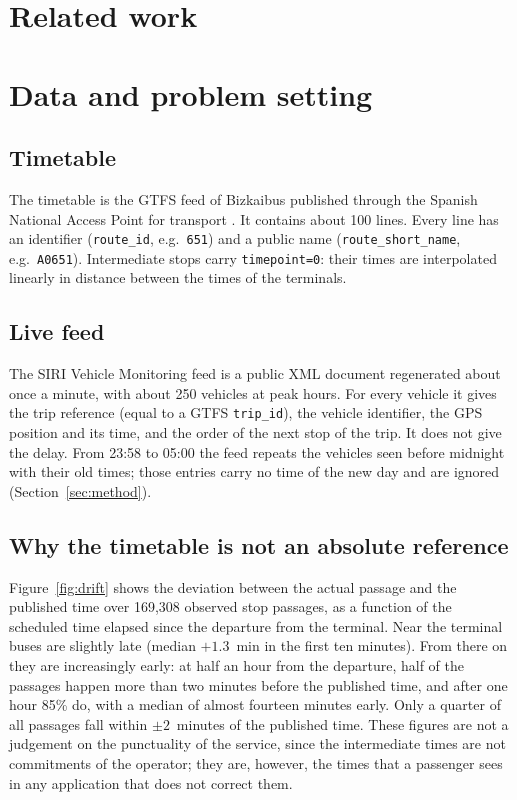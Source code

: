 \documentclass[preprint,11pt,nonatbib]{elsarticle}
\begin{document}
\section{Related work}
\label{sec:related}



\section{Data and problem setting}
\label{sec:data}

\subsection{Timetable}
The timetable is the GTFS feed of Bizkaibus published through the Spanish National Access Point for transport
\parencite{nap}. It contains about 100 lines. Every line has an identifier (\texttt{route\_id}, e.g.\ \texttt{651})
and a public name (\texttt{route\_short\_name}, e.g.\ \texttt{A0651}). Intermediate stops carry
\texttt{timepoint=0}: their times are interpolated linearly in distance between the times of the terminals.

\subsection{Live feed}
The SIRI Vehicle Monitoring feed is a public XML document regenerated about once a minute, with about 250 vehicles at
peak hours. For every vehicle it gives the trip reference (equal to a GTFS \texttt{trip\_id}), the vehicle
identifier, the GPS position and its time, and the order of the next stop of the trip. It does not give the delay.
From 23:58 to 05:00 the feed repeats the vehicles seen before midnight with their old times; those entries carry no
time of the new day and are ignored (Section~\ref{sec:method}).

\subsection{Why the timetable is not an absolute reference}
\label{sec:drift}

Figure~\ref{fig:drift} shows the deviation between the actual passage and the published time over 169,308 observed
stop passages, as a function of the scheduled time elapsed since the departure from the terminal. Near the terminal
buses are slightly late (median $+1.3$~min in the first ten minutes). From there on they are increasingly early: at
half an hour from the departure, half of the passages happen more than two minutes before the published time, and
after one hour 85\% do, with a median of almost fourteen minutes early. Only a quarter of all passages fall within
$\pm2$~minutes of the published time. These figures are not a judgement on the punctuality of the service, since the
intermediate times are not commitments of the operator; they are, however, the times that a passenger sees in any
application that does not correct them.
\end{document}
